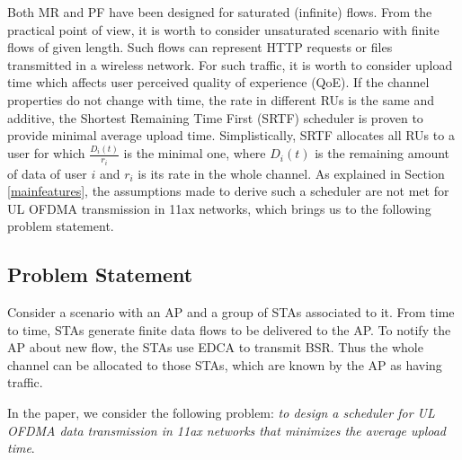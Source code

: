 Both MR and PF have been designed for saturated (infinite) flows.
From the practical point of view, it is worth to consider unsaturated scenario with finite flows of given length.
Such flows can represent HTTP requests or files transmitted in a wireless network.
For such traffic, it is worth to consider upload time which affects user perceived quality of experience (QoE).
If the channel properties do not change with time, the rate in different RUs is the same and additive, the Shortest Remaining Time First (SRTF) scheduler is proven to provide minimal average upload time.
Simplistically, SRTF allocates all RUs to a user for which $\frac{D_i(t)}{r_i}$ is the minimal one, where $D_i(t)$ is the remaining amount of data of user $i$ and $r_i$ is its rate in the whole channel.
As explained in Section \ref{mainfeatures}, the assumptions made to derive such a scheduler are not met for UL OFDMA transmission in 11ax networks, which brings us to the following problem statement.

\subsection{Problem Statement}
\label{problem}
Consider a scenario with an AP and a group of STAs associated to it.
From time to time, STAs generate finite data flows to be delivered to the AP. To notify the AP about new flow, the STAs use EDCA to transmit BSR. Thus the whole channel can be allocated to those STAs, which are known by the AP as having traffic. 

In the paper, we consider the following problem: \emph{to design a scheduler for UL OFDMA data transmission in 11ax networks that minimizes the average upload time}.


